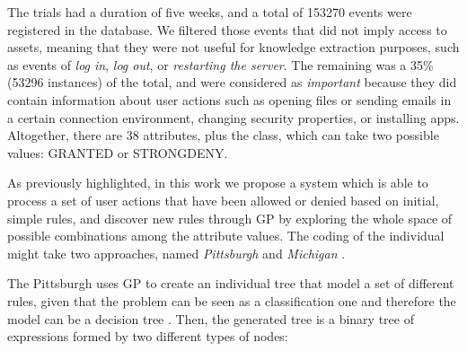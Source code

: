 \documentclass[runningheads]{llncs}
\begin{document}
The trials had a duration of five weeks, and a total of 
153270 events were registered in the database. We filtered those events that did not imply access to assets, meaning that they were not useful for
knowledge extraction purposes, such as events of \textit{log in},
\textit{log out}, or \textit{restarting the server}.
The remaining was a 35\% (53296 instances) of the total, and were considered as \textit{important}
because they did contain information about user actions such as
opening files or sending emails in a certain connection environment,
changing security properties, or installing apps. Altogether, there
are 38 attributes, plus the class, which can take two possible values:
GRANTED or STRONGDENY. 


\label{subsec:solution}

As previously highlighted, in this work we propose a system which is
able to process a set of user actions that have been allowed or denied
based on initial, simple rules, and discover new rules through GP by exploring
the whole space of possible combinations among the attribute
values. The coding of the individual might take two approaches, named \textit{Pittsburgh} and \textit{Michigan}
\cite{freitas2002data}.

The Pittsburgh uses GP to create an individual tree that
model a set of different rules, given that the problem can be seen as
a 
classification one and therefore the model can be a decision tree
\cite{safavian1990survey}. Then, the generated tree is a binary tree
of expressions formed by two different types of nodes:
\end{document}
